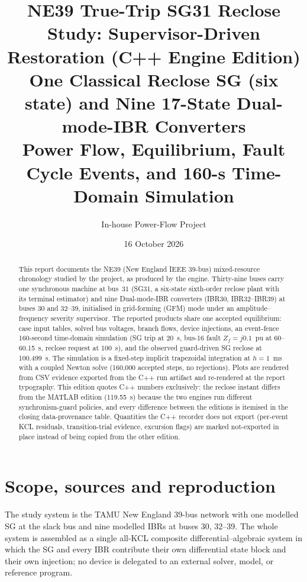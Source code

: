 \documentclass[12pt,a4paper]{article}
\title{\textbf{NE39 True-Trip SG31 Reclose Study: Supervisor-Driven Restoration
(C++ Engine Edition)}\\
\large One Classical Reclose SG (six state) and Nine 17-State Dual-mode-IBR Converters\\[1mm]
\normalsize Power Flow, Equilibrium, Fault Cycle Events, and 160-s Time-Domain Simulation}
\author{In-house Power-Flow Project}
\date{16 October 2026}
\newcommand{\code}[1]{\texttt{\detokenize{#1}}}
\begin{document}
\maketitle

\begin{abstract}
This report documents the NE39 (New England IEEE 39-bus) mixed-resource chronology
studied by the project, as produced by the \code{GridFormLab C++ stage2-ibr}
engine.  Thirty-nine buses carry one synchronous machine at bus~31
(SG31, a six-state sixth-order reclose plant with its terminal estimator) and
nine Dual-mode-IBR converters
(IBR30, IBR32--IBR39) at buses 30 and 32--39, initialised in grid-forming (GFM)
mode under an amplitude--frequency severity supervisor.
The reported products share one accepted equilibrium: case input tables, solved bus
voltages, branch flows, device injections, an event-fence 160-second time-domain
simulation (SG trip at 20~s, bus-16 fault $Z_f=j0.1$~pu at 60--60.15~s, reclose
request at 100~s), and the observed guard-driven SG reclose at 100.499~s.
The simulation is a fixed-step implicit trapezoidal integration at
$h=1$~ms with a coupled Newton solve (160{,}000 accepted steps, no rejections).
Plots are rendered from CSV evidence exported from the C++ run artifact and
re-rendered at the report typography.  This edition quotes C++ numbers
exclusively: the reclose instant differs from the MATLAB edition (119.55~s)
because the two engines run different synchronism-guard policies, and every
difference between the editions is itemised in the closing data-provenance
table.  Quantities the C++ recorder does not export (per-event KCL residuals,
transition-trial evidence, excursion flags) are marked not-exported in place
instead of being copied from the other edition.
\end{abstract}

\newpage
\tableofcontents
\newpage

\section{Scope, sources and reproduction}\label{sec:scope}

The study system is the TAMU New England 39-bus network with one modelled SG at
the slack bus and nine modelled IBRs at buses 30, 32--39.  The whole system is
assembled as a single all-KCL composite differential--algebraic system in which
the SG and every IBR contribute their own differential state block and their own
injection; no device is delegated to an external solver, model, or reference
program.
\end{document}
